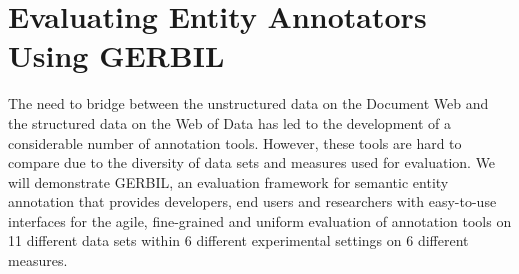 




%

\chapter{Evaluating Entity Annotators Using GERBIL}




The need to bridge between the unstructured data on the Document Web and the structured data on the Web of Data has led to the development of a considerable number of annotation tools. However, these tools are hard to compare due to the diversity of data sets and measures used for evaluation. 
We will demonstrate GERBIL, an evaluation framework for semantic entity annotation that provides developers, end users and researchers with easy-to-use interfaces for the agile, fine-grained and uniform evaluation of annotation tools on 11 different data sets within 6 different experimental settings on 6 different measures. 


